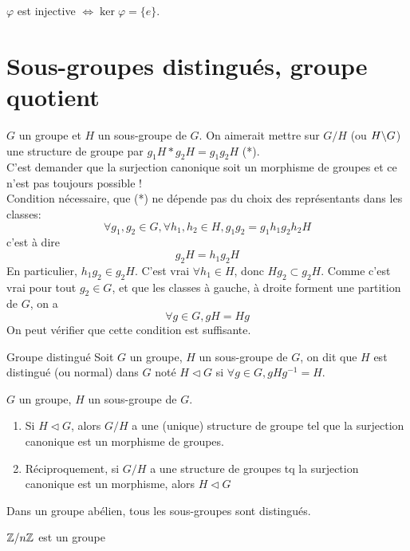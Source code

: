 \documentclass[]{report}
\begin{document}
\begin{prop}{}{}
    $\varphi$ est injective $\iff \ker \varphi=\{e\}$.
\end{prop}

\section{Sous-groupes distingués, groupe quotient}

$G$ un groupe et $H$ un sous-groupe de $G$. On aimerait mettre sur $G/H$ (ou $H\backslash G$) une structure de groupe par $g_1 H*g_2 H=g_1 g_2 H$ (*).\\
C'est demander que la surjection canonique soit un morphisme de groupes et ce n'est pas toujours possible !\\
Condition nécessaire, que (*) ne dépende pas du choix des représentants dans les classes:
\[\forall g_1,g_2\in G,\forall h_1,h_2\in H, g_1 g_2=g_1 h_1 g_2 h_2 H\]
c'est à dire
\[g_2 H=h_1g_2 H\]
En particulier, $h_1 g_2\in g_2 H$. C'est vrai $\forall h_1\in H$, donc $Hg_2\subset g_2 H$. Comme c'est vrai pour tout $g_2\in G$, et que les classes à gauche, à droite forment une partition de $G$, on a
\[\forall g\in G ,gH=Hg\]
On peut vérifier que cette condition est suffisante.

\begin{df}{Groupe distingué}{}
    Soit $G$ un groupe, $H$ un sous-groupe de $G$, on dit que $H$ est distingué (ou normal) dans $G$ noté $H\triangleleft G$ si $\forall g\in G, gHg^{-1}=H$.
\end{df}

\begin{prop}{}{}
    $G$ un groupe, $H$ un sous-groupe de $G$.
    \begin{enumerate}
        \item Si $H\triangleleft G$, alors $G/H$ a une (unique) structure de groupe tel que la surjection canonique est un morphisme de groupes.
        \item Réciproquement, si $G/H$ a une structure de groupes tq la surjection canonique est un morphisme, alors $H\triangleleft G$
    \end{enumerate}
\end{prop}

\begin{re}{}{}
    Dans un groupe abélien, tous les sous-groupes sont distingués.
\end{re}

\begin{ex}{}{}
    $\mathbb{Z}/n\mathbb{Z}$ est un groupe
\end{ex}
\end{document}
